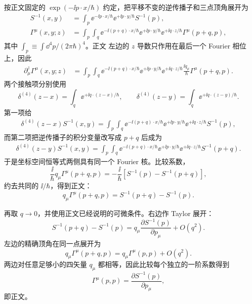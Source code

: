 \begin{derivation}
按正文固定的 $\exp(-\ii p\cdot x/\hbar)$ 约定，把平移不变的逆传播子和三点顶角展开为
\begin{align*}
S^{-1}(x,y)
&=\int_p
 \ee^{-\ii p\cdot x/\hbar}
 \ee^{+\ii p\cdot y/\hbar}S^{-1}(p),\\
\Gamma^\mu(x,y;z)
&=\int_p\!\int_q
 \ee^{-\ii(p+q)\cdot x/\hbar}
 \ee^{+\ii p\cdot y/\hbar}
 \ee^{+\ii q\cdot z/\hbar}
 \Gamma^\mu(p+q,p),
\end{align*}
其中 $\int_p\equiv\int \dd^4 p/(2\pi\hbar)^4$。正文 左边的 $z$ 导数只作用在最后一个 Fourier 相位上，因此
\begin{align*}
\partial_\mu^z\Gamma^\mu(x,y;z)
&=\int_p\!\int_q
 \ee^{-\ii(p+q)\cdot x/\hbar}
 \ee^{+\ii p\cdot y/\hbar}
 \ee^{+\ii q\cdot z/\hbar}
 \frac{\ii q_\mu}{\hbar}
 \Gamma^\mu(p+q,p).
\end{align*}
两个接触项分别使用
\begin{equation*}
\delta^{(4)}(z-x)=\int_q\ee^{+\ii q\cdot(z-x)/\hbar},
\qquad
\delta^{(4)}(z-y)=\int_q\ee^{+\ii q\cdot(z-y)/\hbar}.
\end{equation*}
第一项给
\begin{align*}
\delta^{(4)}(z-x)S^{-1}(x,y)
=\int_p\!\int_q
 \ee^{-\ii(p+q)\cdot x/\hbar}
 \ee^{+\ii p\cdot y/\hbar}
 \ee^{+\ii q\cdot z/\hbar}S^{-1}(p),
\end{align*}
而第二项把逆传播子的积分变量改写成 $p+q$ 后成为
\begin{align*}
\delta^{(4)}(z-y)S^{-1}(x,y)
=\int_p\!\int_q
 \ee^{-\ii(p+q)\cdot x/\hbar}
 \ee^{+\ii p\cdot y/\hbar}
 \ee^{+\ii q\cdot z/\hbar}S^{-1}(p+q).
\end{align*}
于是坐标空间恒等式两侧具有同一个 Fourier 核。比较系数，
\begin{equation*}
\frac{\ii}{\hbar}q_\mu\Gamma^\mu(p+q,p)
=-\frac{\ii}{\hbar}\left[S^{-1}(p)-S^{-1}(p+q)\right],
\end{equation*}
约去共同的 $\ii/\hbar$，得到正文：
\begin{equation*}
 q_\mu\Gamma^\mu(p+q,p)
 =S^{-1}(p+q)-S^{-1}(p).
\end{equation*}

再取 $q\to0$，并使用正文已经说明的可微条件。右边作 Taylor 展开：
\begin{equation*}
 S^{-1}(p+q)-S^{-1}(p)
 =q_\mu\frac{\partial S^{-1}(p)}{\partial p_\mu}+O(q^2).
\end{equation*}
左边的精确顶角在同一点展开为
\begin{equation*}
 q_\mu\Gamma^\mu(p+q,p)
 =q_\mu\Gamma^\mu(p,p)+O(q^2).
\end{equation*}
两边对任意足够小的四矢量 $q_\mu$ 都相等，因此比较每个独立的一阶系数得到
\begin{equation*}
 \Gamma^\mu(p,p)=\frac{\partial S^{-1}(p)}{\partial p_\mu},
\end{equation*}
即正文。
\end{derivation}

